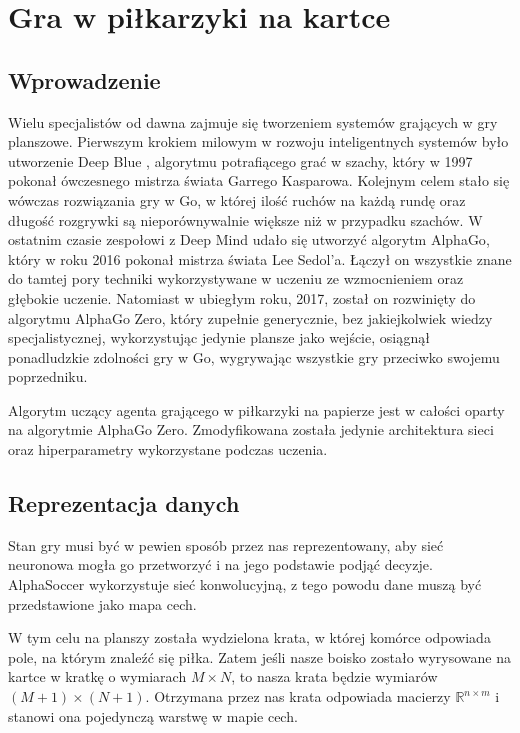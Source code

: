 \documentclass[licencjacka]{pracamgr}
\begin{document}
\chapter{Gra w piłkarzyki na kartce}

\section{Wprowadzenie}

Wielu specjalistów od dawna zajmuje się tworzeniem systemów grających w gry planszowe. Pierwszym krokiem milowym w rozwoju inteligentnych systemów było utworzenie Deep Blue \cite{deep-blue}, algorytmu potrafiącego grać w szachy, który w 1997 pokonał ówczesnego mistrza świata Garrego Kasparowa. Kolejnym celem stało się wówczas rozwiązania gry w Go, w której ilość ruchów na każdą rundę oraz długość rozgrywki są nieporównywalnie większe niż w przypadku szachów. W ostatnim czasie zespołowi z Deep Mind udało się utworzyć algorytm AlphaGo\cite{alphago2016}, który w roku 2016 pokonał mistrza świata Lee Sedol'a. Łączył on wszystkie znane do tamtej pory techniki wykorzystywane w uczeniu ze wzmocnieniem oraz głębokie uczenie. Natomiast w ubiegłym roku, 2017, został on rozwinięty do algorytmu AlphaGo Zero\cite{alphagozero}, który zupełnie generycznie, bez jakiejkolwiek wiedzy specjalistycznej, wykorzystując jedynie plansze jako wejście, osiągnął ponadludzkie zdolności gry w Go, wygrywając wszystkie gry przeciwko swojemu poprzedniku. 

Algorytm uczący agenta grającego w piłkarzyki na papierze jest w całości oparty na algorytmie AlphaGo Zero. Zmodyfikowana została jedynie architektura sieci oraz hiperparametry wykorzystane podczas uczenia.


\section{Reprezentacja danych}

Stan gry musi być w pewien sposób przez nas reprezentowany, aby sieć neuronowa mogła go przetworzyć i na jego podstawie podjąć decyzje. AlphaSoccer wykorzystuje sieć konwolucyjną, z tego powodu dane muszą być przedstawione jako mapa cech. 

W tym celu na planszy została wydzielona krata, w której komórce odpowiada pole, na którym znaleźć się piłka. Zatem jeśli nasze boisko zostało wyrysowane na kartce w kratkę o wymiarach $M \times N$, to nasza krata będzie wymiarów $(M + 1) \times (N + 1)$. Otrzymana przez nas krata odpowiada macierzy $\mathbb{R}^{n \times m}$ i stanowi ona pojedynczą warstwę w mapie cech. 
\end{document}

